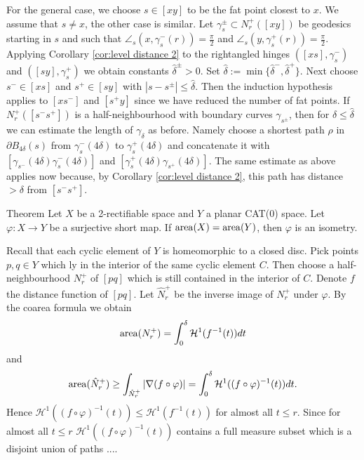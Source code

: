 \documentclass[a4paper,10pt]{amsart}
\begin{document}
For the general case, we choose $s\in[xy]$ to be the fat point closest to $x$. We assume that $s\neq x$,
the other case is similar. Let $\gamma_s^\pm\subset N_r^+([x y])$ be geodesics starting in $s$ and such that 
$\angle_s(x,\gamma_s^-(r))=\frac{\pi}{2}$ and $\angle_s(y,\gamma_s^+(r))=\frac{\pi}{2}$. Applying Corollary 
\ref{cor:level distance 2}
to the rightangled hinges $([xs],\gamma_s^-)$ and $([sy],\gamma_s^+)$ we obtain constants $\hat\delta^\pm>0$. 
Set $\hat\delta:=\min\{\hat\delta^-,\hat\delta^+\}$.
Next choose $s^-\in[xs]$ and $s^+\in[sy]$ with $|s-s^\pm|\leq\hat\delta$. Then the induction hypothesis applies 
to $[xs^-]$ and $[s^+y]$ since we have reduced 
the number of fat points. If $N^+_r([s^- s^+])$ is a half-neighbourhood with boundary curves $\gamma_{s^\pm}$, 
then for $\delta\leq\hat\delta$ we can estimate the length of $\gamma_\delta$ as before. 
Namely choose a shortest path $\rho$ in $\partial B_{4\delta}(s)$ from $\gamma_s^-(4\delta)$ to $\gamma_s^+(4\delta)$ 
and concatenate it 
with $[\gamma_{s^-}(4\delta)\gamma_s^-(4\delta)]$ and $[\gamma_s^+(4\delta)\gamma_{s^+}(4\delta)]$. The same estimate 
as above applies now because, by Corollary \ref{cor:level distance 2}, this path has distance $>\delta$ from $[s^- s^+]$.
\qeds






\begin{thm}{Theorem}\label{thm:short+area=isom}
Let $X$ be a 2-rectifiable space and $Y$ a planar CAT(0) space. 
Let $\varphi:X\to Y$ be a surjective short map. If $\mathop{\rm area}\nolimits(X)=\mathop{\rm area}\nolimits(Y)$,
then $\varphi$ is an isometry. 
\end{thm}

Recall that each cyclic element of $Y$ is homeomorphic to a closed disc. 
Pick points $p,q\in Y$ which ly in the interior of the same cyclic element $C$. 
Then choose a half-neighbourhood $N_r^+$ of $[pq]$ which is still contained
in the interior of $C$. Denote $f$ the distance function of $[pq]$.
Let $\hat N_r^+$ be the inverse image of $N_r^+$
under $\varphi$. 
By the coarea formula we obtain
$$
\mathop{\rm area}\nolimits(N_r^+)=\int_0^\delta \mathcal{H}^1(f^ {-1}(t))dt
$$
and
$$
\mathop{\rm area}\nolimits(\hat N_r^+)\geq\int_{\hat N_r^+}|\nabla (f\circ\varphi)|=\int_0^\delta \mathcal{H}^1((f\circ\varphi)^ {-1}(t))dt.
$$
Hence $\mathcal{H}^1((f\circ\varphi)^ {-1}(t))\leq \mathcal{H}^1(f^ {-1}(t))$ for almost all $t\leq r$.
Since for almost all $t\leq r$ $\mathcal{H}^1((f\circ\varphi)^ {-1}(t))$ contains a full measure subset which is a disjoint union of paths ....
 
\end{document}
